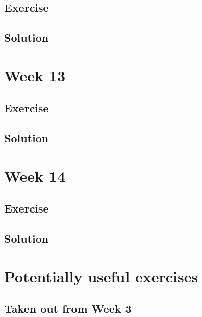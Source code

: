 \documentclass[
]{book}
\begin{document}
\hypertarget{exercise-8}{%
\section{Exercise}\label{exercise-8}}

\hypertarget{solution-7}{%
\section{Solution}\label{solution-7}}

\hypertarget{week-13}{%
\chapter{Week 13}\label{week-13}}

\hypertarget{exercise-9}{%
\section{Exercise}\label{exercise-9}}

\hypertarget{solution-8}{%
\section{Solution}\label{solution-8}}

\hypertarget{week-14}{%
\chapter{Week 14}\label{week-14}}

\hypertarget{exercise-10}{%
\section{Exercise}\label{exercise-10}}

\hypertarget{solution-9}{%
\section{Solution}\label{solution-9}}

\hypertarget{potentially-useful-exercises}{%
\chapter{Potentially useful exercises}\label{potentially-useful-exercises}}

\hypertarget{taken-out-from-week-3}{%
\section{Taken out from Week 3}\label{taken-out-from-week-3}}
\end{document}

